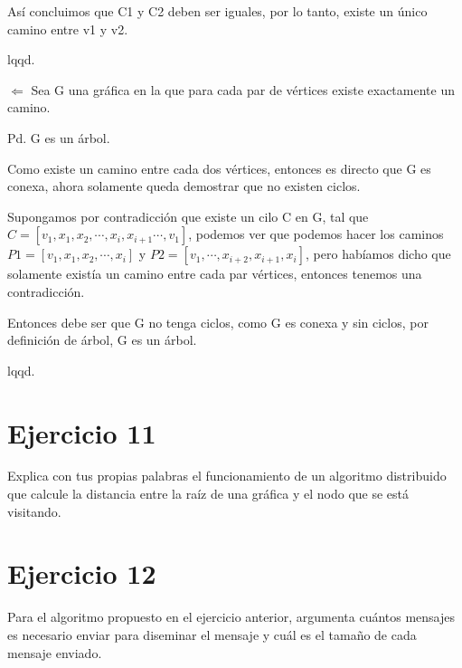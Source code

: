 \documentclass{article}
\begin{document}
Así concluimos que C1 y C2 deben ser iguales, por lo tanto, existe un único camino entre v1 y v2.

lqqd.

$\Leftarrow$ Sea G una gráfica en la que para cada par de vértices existe exactamente un camino.

Pd. G es un árbol.

Como existe un camino entre cada dos vértices, entonces es directo que G es conexa, ahora solamente queda demostrar que no existen ciclos.

Supongamos por contradicción que existe un cilo C en G, tal que $C=[v_1,x_1,x_2,\cdots,x_i,x_{i+1}\cdots,v_1]$, podemos ver que podemos hacer los caminos $P1=[v_1,x_1,x_2,\cdots,x_i]$ y $P2=[v_1,\cdots,x_{i+2},x_{i+1},x_i]$, pero habíamos dicho que solamente existía un camino entre cada par vértices, entonces tenemos una contradicción.

Entonces debe ser que G no tenga ciclos, como G es conexa y sin ciclos, por definición de árbol, G es un árbol.

lqqd.
\section*{Ejercicio 11}
Explica con tus propias palabras el funcionamiento de un algoritmo distribuido que calcule la distancia entre la raíz de una gráfica y el nodo que se está visitando.



\section*{Ejercicio 12}
Para el algoritmo propuesto en el ejercicio anterior, argumenta cuántos mensajes es necesario enviar para diseminar el mensaje y cuál es el tamaño de cada mensaje enviado.
\end{document}
